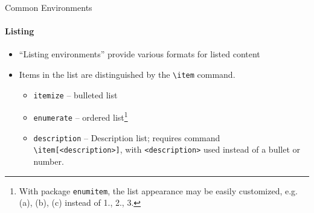 \documentclass{beamer}
\begin{document}
\begin{frame}{Common Environments}
\framesubtitle{Listing}
	\begin{itemize}
		\item<1-> ``Listing environments'' provide various formats for listed content
		\item<2-> Items in the list are distinguished by the \texttt{\textbackslash item} command.
			\begin{itemize}
				\item \texttt{itemize} -- bulleted list
				\item \texttt{enumerate} -- ordered list\footnote{With package \texttt{enumitem}, the list appearance may be easily customized, e.g. (a), (b), (c) instead of 1., 2., 3.}
				\item \texttt{description} -- Description list; requires command \texttt{\textbackslash item[<description>]}, with \texttt{<description>} used instead of a bullet or number.
			\end{itemize}
	\end{itemize}
\end{frame}
\end{document}
